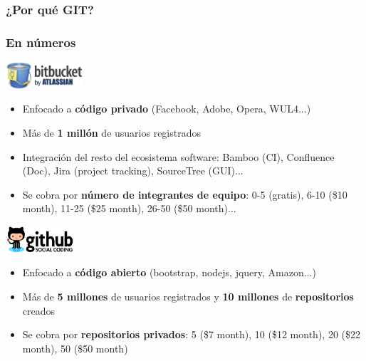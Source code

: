 \frame
{
\frametitle{¿Por qué GIT?}
}
\usebackgroundtemplate{}
\frame
{
\frametitle{En números}
\includegraphics[height=1cm]{imgs/git-bitbucket.png}
\begin{itemize}
 \item Enfocado a \textbf{código privado} (Facebook, Adobe, Opera, WUL4...)
 \item Más de \textbf{1 millón} de usuarios registrados
 \item Integración del resto del ecosistema software: Bamboo (CI), Confluence (Doc), Jira (project tracking), SourceTree (GUI)...
 \item Se cobra por \textbf{número de integrantes de equipo}: 0-5 (gratis), 6-10 (\$10 month), 11-25 (\$25 month), 26-50 (\$50 month)...
\end{itemize}

\includegraphics[height=1cm]{imgs/git-github.png}
\begin{itemize}
 \item Enfocado a \textbf{código abierto} (bootstrap, nodejs, jquery, Amazon...)
 \item Más de \textbf{5 millones} de usuarios registrados y \textbf{10 millones} de \textbf{repositorios} creados
 \item Se cobra por \textbf{repositorios privados}: 5 (\$7 month), 10 (\$12 month), 20 (\$22 month), 50 (\$50 month)
\end{itemize}
}
